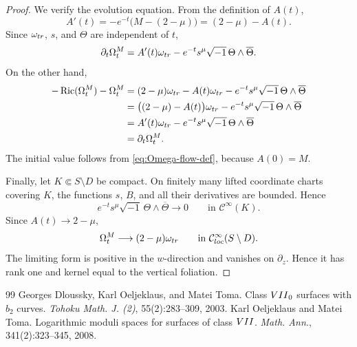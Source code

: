 \documentclass[10pt,a4paper]{amsart}
\numberwithin{equation}{section}
\begin{document}
\begin{proof}
We verify the evolution equation. From the definition of $A(t)$,
\begin{equation*}
 A'(t)
 =
 -e^{-t}\bigl(M-(2-\mu)\bigr)
 =
 (2-\mu)-A(t).
\end{equation*}
Since $\omega_{\rm tr}$, $s$, and $\Theta$ are independent of $t$,
\begin{equation*}
 \partial_t\Omega_t^M
 =
 A'(t)\omega_{\rm tr}
 -
 e^{-t}s^\mu\sqrt{-1}\,\Theta\wedge\overline\Theta.
\end{equation*}
On the other hand,
\begin{align*}
 -\operatorname{Ric}(\Omega_t^M)-\Omega_t^M
 &=
 (2-\mu)\omega_{\rm tr}
 -
 A(t)\omega_{\rm tr}
 -
 e^{-t}s^\mu\sqrt{-1}\,\Theta\wedge\overline\Theta \\
 &=
 \bigl((2-\mu)-A(t)\bigr)\omega_{\rm tr}
 -
 e^{-t}s^\mu\sqrt{-1}\,\Theta\wedge\overline\Theta \\
 &= A'(t)\omega_{\rm tr} - e^{-t} s^\mu \sqrt{-1}\,\Theta\wedge\overline\Theta \\
 &= \partial_t\Omega_t^M.
\end{align*}
The initial value follows from \eqref{eq:Omega-flow-def}, because $A(0)=M$.

Finally, let $K\Subset S\setminus D$ be compact. On finitely many lifted
coordinate charts covering $K$, the functions $s$, $B$, and all their
derivatives are bounded. Hence
\begin{equation*}
 e^{-t}s^\mu\sqrt{-1}\,\Theta\wedge\overline\Theta
 \longrightarrow 0
 \qquad
 \text{in }\mathcal C^\infty(K).
\end{equation*}
Since $A(t)\to2-\mu$,
\begin{equation*}
 \Omega_t^M
 \longrightarrow
 (2-\mu)\omega_{\rm tr}
 \qquad
 \text{in }\mathcal C^\infty_{\rm loc}(S\setminus D).
\end{equation*}
The limiting form is positive in the $w$-direction and vanishes on
$\partial_z$. Hence it has rank one and kernel equal to the vertical
foliation.
\end{proof}

\begin{thebibliography}{99}
 Georges Dloussky, Karl Oeljeklaus, and Matei Toma. \newblock Class ${\rm VII}_0$ surfaces with $b_2$ curves. \newblock \emph{Tohoku Math. J. (2)}, 55(2):283--309, 2003.
 Karl Oeljeklaus and Matei Toma. \newblock Logarithmic moduli spaces for surfaces of class ${\rm VII}$. \newblock \emph{Math. Ann.}, 341(2):323--345, 2008.
\end{thebibliography}
\end{document}

